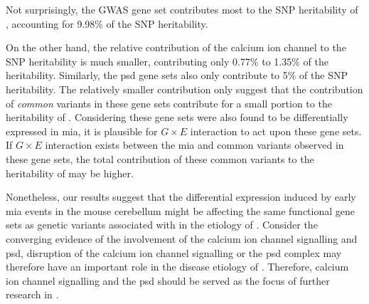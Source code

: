 Not surprisingly, the  \gls{GWAS} gene set contributes most to the \gls{SNP} heritability of , accounting for 9.98\% of the \gls{SNP} heritability.

On the other hand, the relative contribution of the calcium ion channel to the \gls{SNP} heritability is much smaller, contributing only 0.77\% to 1.35\% of the heritability.
Similarly, the \gls{psd} gene sets also only contribute to 5\% of the \gls{SNP} heritability.
The relatively smaller contribution only suggest that the contribution of \emph{common} variants in these gene sets contribute for a small portion to the heritability of .
Considering these gene sets were also found to be differentially expressed in \gls{mia}, it is plausible for $G\times E$ interaction to act upon these gene sets.
If $G\times E$ interaction exists between the \gls{mia} and common variants observed in these gene sets, the total contribution of these common variants to the heritability of  may be higher.

Nonetheless, our results suggest that the differential expression induced by early \gls{mia} events in the mouse cerebellum might be affecting the same functional gene sets as genetic variants associated with  in the etiology of .
Consider the converging evidence of the involvement of the calcium ion channel signalling and \gls{psd}, disruption of the calcium ion channel signalling or the \gls{psd} complex may therefore have an important role in the disease etiology of .
Therefore, calcium ion channel signalling and the \gls{psd} should be served as the focus of further research in .

